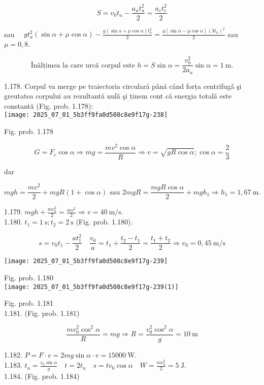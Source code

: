 $$
S=v_{0} t_{u}-\frac{a_{u} t_{u}^{2}}{2}=\frac{a_{c} t_{c}^{2}}{2}
$$

sau $\quad g t_{u}^{2}(\sin \alpha+\mu \cos \alpha)-\frac{g(\sin \alpha+\mu \cos \alpha) t_{u}^{2}}{2}=\frac{g(\sin \alpha-\mu \cos \alpha)\left(3 t_{u}\right)^{2}}{2}$ sau $\mu=0,8$.

$$
\text { Înălțimea la care urcă corpul este } h=S \sin \alpha=\frac{v_{0}^{2}}{2 a_{u}} \sin \alpha=1 \mathrm{~m} \text {. }
$$

1.178. Corpul va merge pe traiectoria circulară până când forța centrifugǎ şi greutatea corpului au rezultantă nulă şi ținem cont că energia totală este constantă (Fig. prob. 1.178):\\
\texttt{[image: 2025\_07\_01\_5b3ff9fa0d508c8e9f17g-238]}

Fig. prob. 1.178

$$
G=F_{c} \cos \alpha \Rightarrow m g=\frac{m v^{2} \cos \alpha}{R} \Rightarrow v=\sqrt{g R \cos \alpha} ; \cos \alpha=\frac{2}{3}
$$

dar

$$
m g h=\frac{m v^{2}}{2}+m g R(1+\cos \alpha) \text { sau } 2 m g R=\frac{m g R \cos \alpha}{2}+m g h_{1} \Rightarrow h_{1}=1,67 \mathrm{~m} .
$$

1.179. $m g h+\frac{m v_{0}^{2}}{2}=\frac{m v^{2}}{2} \Rightarrow v=40 \mathrm{~m} / \mathrm{s}$.\\
1.180. $t_{1}=1 \mathrm{~s} ; t_{2}=2 \mathrm{~s}$ (Fig. prob. 1.180).

$$
s=v_{0} t_{1}-\frac{a t_{1}^{2}}{2} \quad \frac{v_{0}}{a}=t_{1}+\frac{t_{2}-t_{1}}{2}=\frac{t_{1}+t_{2}}{2} \Rightarrow v_{0}=0,45 \mathrm{~m} / \mathrm{s}
$$

\begin{center}
\texttt{[image: 2025\_07\_01\_5b3ff9fa0d508c8e9f17g-239]}
\end{center}

Fig. prob. 1.180\\
\texttt{[image: 2025\_07\_01\_5b3ff9fa0d508c8e9f17g-239(1)]}

Fig. prob. 1.181\\
1.181. (Fig. prob. 1.181)

$$
\frac{m v_{0}^{2} \cos ^{2} \alpha}{R}=m g \Rightarrow R=\frac{v_{0}^{2} \cos ^{2} \alpha}{g}=10 \mathrm{~m}
$$

1.182. $P=F \cdot v=2 m g \sin \alpha \cdot v=15000 \mathrm{~W}$.\\
1.183. $t_{u}=\frac{v_{0} \sin \alpha}{g} \quad t=2 t_{u} \quad s=t v_{0} \cos \alpha \quad W=\frac{m v_{0}^{2}}{2}=5 \mathrm{~J}$.\\
1.184. (Fig. prob. 1.184)

